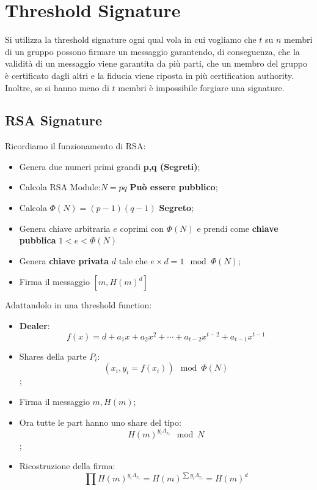 \documentclass{book}
\begin{document}
\section{Threshold Signature}
Si utilizza la threshold signature ogni qual vola in cui vogliamo che \(t\) su \(n\) membri di un gruppo possono firmare un messaggio garantendo, di conseguenza, che la validità di un messaggio viene garantita da più parti, che un membro del gruppo è certificato dagli altri e la fiducia viene riposta in più certification authority\@.
Inoltre, se si hanno meno di \(t\) membri è impossibile forgiare una signature.
\subsection{RSA Signature}
Ricordiamo il funzionamento di RSA:\begin{itemize}
    \item Genera due numeri primi grandi \textbf{p,q (Segreti)};\@
    \item Calcola RSA Module:\(N=pq\) \textbf{Può essere pubblico};\@
    \item Calcola \(\Phi(N)=(p-1)(q-1)\) \textbf{Segreto};\@
    \item Genera chiave arbitraria \(e\) coprimi con \(\Phi(N)\) e prendi come \textbf{chiave pubblica} \(1<e<\Phi(N)\)
    \item Genera \textbf{chiave privata} \(d\) tale che \(e\times d=1\mod{\Phi(N)}\);
    \item Firma il messaggio \([m,{H(m)}^{d}]\)
\end{itemize}
Adattandolo in una threshold function:\begin{itemize}
    \item \textbf{Dealer}:\begin{equation*}
              f(x)=d+a_{1}x+a_{2}x^{2}+\cdots +a_{t-2}x^{t-2}+a_{t-1}x^{t-1}
          \end{equation*}
    \item Shares della parte \(P_{i}\):\begin{equation*}
              (x_{i},y_{i}=f(x_{i}))\mod{\Phi(N)}
          \end{equation*};
    \item Firma il messaggio \(m,H(m)\);
    \item Ora tutte le part hanno uno share del tipo:\begin{equation*}
              {H(m)}^{y_{i}\Lambda_{x_{i}}}\mod{N}
          \end{equation*};
    \item Ricostruzione della firma:\begin{equation*}
              \prod {H(m)}^{y_{i}\Lambda_{x_{i}}}={H(m)}^{\sum{y_{i}\Lambda_{x_{i}}}}={H(m)}^{d}
          \end{equation*}
\end{itemize}
\end{document}
